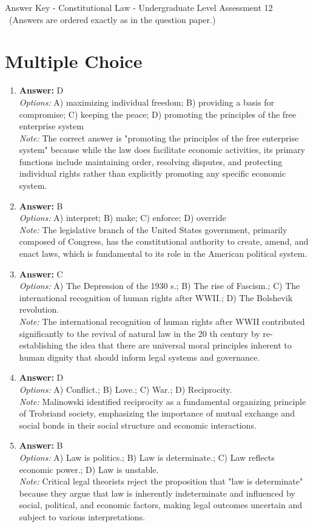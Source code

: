 \documentclass[12pt]{article}
\begin{document}
\begin{center}
Answer Key - Constitutional Law - Undergraduate Level Assessment 12 \
\small (Answers are ordered exactly as in the question paper.)
\end{center}

\section*{Multiple Choice}
\begin{enumerate}[label=\arabic*.]
\item \textbf{Answer:} D
\\ \textit{Options:} A) maximizing individual freedom; B) providing a basis for compromise; C) keeping the peace; D) promoting the principles of the free enterprise system
\\ \textit{Note:} The correct answer is "promoting the principles of the free enterprise system" because while the law does facilitate economic activities, its primary functions include maintaining order, resolving disputes, and protecting individual rights rather than explicitly promoting any specific economic system.
\item \textbf{Answer:} B
\\ \textit{Options:} A) interpret; B) make; C) enforce; D) override
\\ \textit{Note:} The legislative branch of the United States government, primarily composed of Congress, has the constitutional authority to create, amend, and enact laws, which is fundamental to its role in the American political system.
\item \textbf{Answer:} C
\\ \textit{Options:} A) The Depression of the 1930 s.; B) The rise of Fascism.; C) The international recognition of human rights after WWII.; D) The Bolshevik revolution.
\\ \textit{Note:} The international recognition of human rights after WWII contributed significantly to the revival of natural law in the 20 th century by re-establishing the idea that there are universal moral principles inherent to human dignity that should inform legal systems and governance.
\item \textbf{Answer:} D
\\ \textit{Options:} A) Conflict.; B) Love.; C) War.; D) Reciprocity.
\\ \textit{Note:} Malinowski identified reciprocity as a fundamental organizing principle of Trobriand society, emphasizing the importance of mutual exchange and social bonds in their social structure and economic interactions.
\item \textbf{Answer:} B
\\ \textit{Options:} A) Law is politics.; B) Law is determinate.; C) Law reflects economic power.; D) Law is unstable.
\\ \textit{Note:} Critical legal theorists reject the proposition that "law is determinate" because they argue that law is inherently indeterminate and influenced by social, political, and economic factors, making legal outcomes uncertain and subject to various interpretations.
\end{enumerate}
\end{document}
